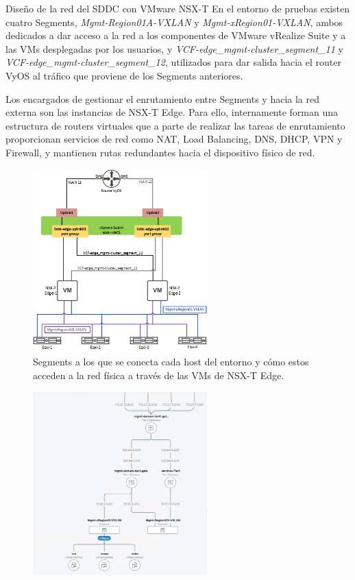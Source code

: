 \begin{subsubsection}{Diseño de la red del SDDC con VMware NSX-T}
    En el entorno de pruebas existen cuatro Segments, \textit{Mgmt-Region01A-VXLAN} y \textit{Mgmt-xRegion01-VXLAN}, ambos dedicados a dar acceso a la red a los componentes de VMware vRealize Suite y a las VMs desplegadas por los usuarios, y \textit{VCF-edge\_mgmt-cluster\_segment\_11} y \textit{VCF-edge\_mgmt-cluster\_segment\_12}, utilizados para dar salida hacia el router VyOS al tráfico que proviene de los Segments anteriores.

    Los encargados de gestionar el enrutamiento entre Segments y hacia la red externa son las instancias de NSX-T Edge. Para ello, internamente forman una estructura de routers virtuales que a parte de realizar las tareas de enrutamiento proporcionan servicios de red como NAT, Load Balancing, DNS, DHCP, VPN y Firewall, y mantienen rutas redundantes hacia el dispositivo físico de red.
    \begin{figure}[h]
        \centering
        \includegraphics[width=0.6\textwidth]{imaxes/pruebaconcepto/estructura_NSX_T.png}
        \caption{Segments a los que se conecta cada host del entorno y cómo estos acceden a la red física a través de las VMs de NSX-T Edge.}
        \label{fig:estructura-NSXT}
      \end{figure}
    \FloatBarrier
    \begin{figure}[h]
        \centering
        \includegraphics[width=0.6\textwidth]{imaxes/pruebaconcepto/vrealize/topology-vrops.png}

\end{figure}
\end{subsubsection}
